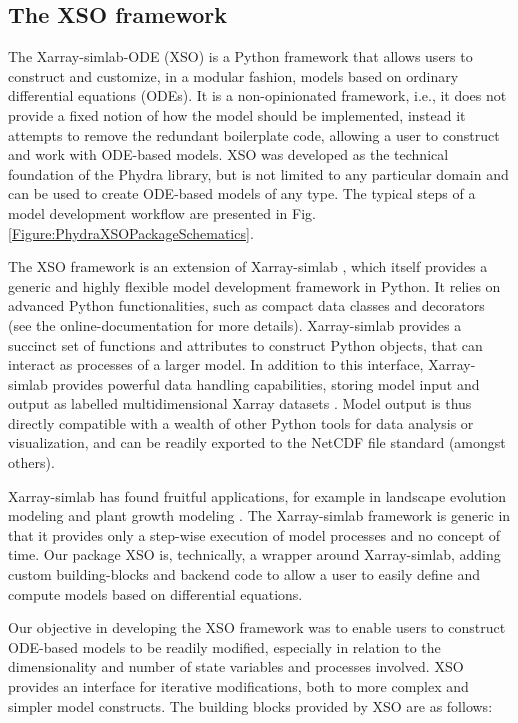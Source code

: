 \documentclass[journal abbreviation, manuscript]{copernicus}
\begin{document}
\subsection{The XSO framework} \label{Section:XSOFramework}


The Xarray-simlab-ODE (XSO) is a Python framework that allows users to construct and customize, in a modular fashion, models based on ordinary differential equations (ODEs). It is a non-opinionated framework, i.e., it does not provide a fixed notion of how the model should be implemented, instead it attempts to remove the redundant boilerplate code, allowing a user to construct and work with ODE-based models. XSO was developed as the technical foundation of the Phydra library, but is not limited to any particular domain and can be used to create ODE-based models of any type. The typical steps of a model development workflow are presented in Fig. \ref{Figure:PhydraXSOPackageSchematics}.

The XSO framework is an extension of Xarray-simlab \citep{Bovy2018Xarray-simlab:Interactively, Bovy2021Benbovy/xarray-simlab:0.5.0}, which itself provides a generic and highly flexible model development framework in Python. It relies on advanced Python functionalities, such as compact data classes and decorators (see the online-documentation for more details). Xarray-simlab provides a succinct set of functions and attributes to construct Python objects, that can interact as processes of a larger model. In addition to this interface, Xarray-simlab provides powerful data handling capabilities, storing model input and output as labelled multidimensional Xarray datasets \citep{Hoyer2017Xarray:Python}. Model output is thus directly compatible with a wealth of other Python tools for data analysis or visualization, and can be readily exported to the NetCDF file standard (amongst others).

Xarray-simlab has found fruitful applications, for example in landscape evolution modeling \citep{Bovy2021Fastscape-lem/fastscape:V0.1.0beta3} and plant growth modeling \citep{Vaillant2022TowardsDevelopment}. The Xarray-simlab framework is generic in that it provides only a step-wise execution of model processes and no concept of time. Our package XSO is, technically, a wrapper around Xarray-simlab, adding custom building-blocks and backend code to allow a user to easily define and compute models based on differential equations.

Our objective in developing the XSO framework was to enable users to construct ODE-based models to be readily modified, especially in relation to the dimensionality and number of state variables and processes involved. XSO provides an interface for iterative modifications, both to more complex and simpler model constructs. The building blocks provided by XSO are as follows:
\end{document}
